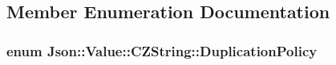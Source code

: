 \subsection{Member Enumeration Documentation}
\hypertarget{classJson_1_1Value_1_1CZString_a2805c46fb4a72bbaed55de6d75941b6d}{
\subsubsection[{Duplication\-Policy}]{\setlength{\rightskip}{0pt plus 5cm}enum {\bf Json\-::\-Value\-::\-C\-Z\-String\-::\-Duplication\-Policy}}}\label{de/d6e/classJson_1_1Value_1_1CZString_a2805c46fb4a72bbaed55de6d75941b6d}
